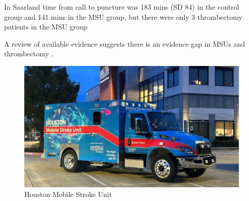In Saarland \cite{helwig_prehospital_2019} time from call to puncture was 183 mins (SD 84) in the control group and 141 mins in the MSU group, but there were only 3 thrombectomy patients in the MSU group


A review of available evidence suggests there is an evidence gap in MSUs and thrombectomy \cite{navi_mobile_2022}.






\begin{figure}
    \centering
    \includegraphics[width=0.5\linewidth]{images_background/houston_msu.jpeg}
    \caption{Houston Mobile Stroke Unit}
    \label{fig:houston_msu}
\end{figure}
